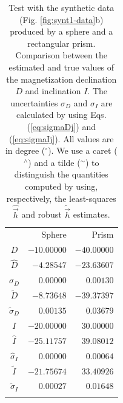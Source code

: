 \documentclass[journal abbreviation, npg]{copernicus}
\begin{document}
\begin{table}[t]
\caption{Test with the synthetic data (Fig. \ref{fig:synt1-data}b) produced by a sphere and a rectangular prism. Comparison between the estimated and true values of the magnetization declination $D$ and inclination $I$. The uncertainties $\sigma_{D}$ and $\sigma_{I}$ are calculated by using Eqs. (\ref{eq:sigmaDj}) and (\ref{eq:sigmaIj}). All values are in degree ($^{\circ}$). We use a caret ($^{\wedge}$) and a tilde ($^{\sim}$) to distinguish the quantities computed by using, respectively, the least-squares $\hat{\vec{h}}$ and robust $\tilde{\vec{h}}$ estimates.}
\vskip4mm
\centering
\begin{tabular}{crr}
\tophline
& Sphere & Prism \\
\middlehline
$D$ & $-10.00000$ & $-40.00000$ \\
$\hat{D}$ & $-4.28547$ & $-23.63607$ \\
$\hat{\sigma}_{D}$ & $0.00000$ & $0.00130$  \\
$\tilde{D}$ & $-8.73648$ & $-39.37397$ \\
$\tilde{\sigma}_{D}$ & $0.00135$ & $0.03679$ \\
$I$ & $-20.00000$ & $30.00000$ \\
$\hat{I}$ & $-25.11757$ & $39.08012$  \\
$\hat{\sigma}_{I}$ & $0.00000$ & $0.00064$  \\
$\tilde{I}$ & $-21.75674$ & $33.40926$ \\
$\tilde{\sigma}_{I}$ & $0.00027$ & $0.01648$ \\
\bottomhline
\end{tabular}
\label{tab:synt1-with-inter-anomaly}
\end{table}








\end{document}
